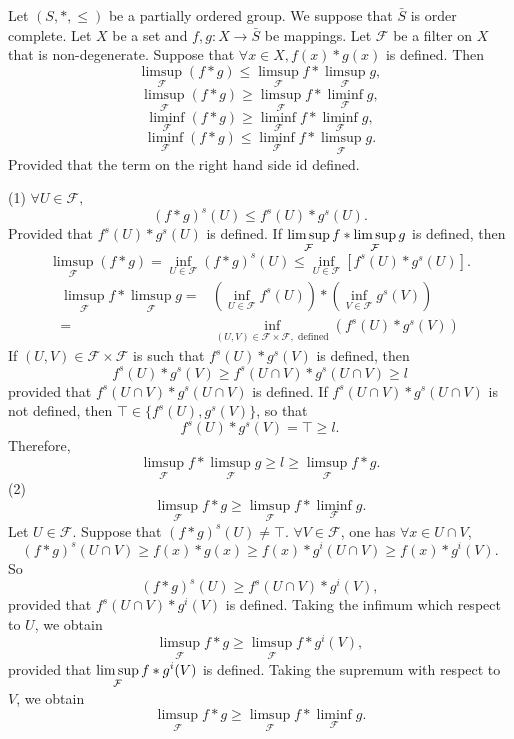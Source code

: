 \begin{theoremenv}
    Let $(S,*,\le)$ be a partially ordered group. We suppose that $\bar{S}$ is order complete. Let $X$ be a set and 
    $f,g:X\longrightarrow \bar{S}$ be mappings. Let $\mathcal{F}$ be a filter on $X$ that is non-degenerate. Suppose that $\forall x\in X, f(x)*g(x)$ is defined. Then 
    $$\limsup_{\mathcal{F}}(f*g)\le \limsup_{\mathcal{F}}f*\limsup_{\mathcal{F}}g,$$
    $$\limsup_{\mathcal{F}}(f*g)\ge \limsup_{\mathcal{F}}f*\liminf_{\mathcal{F}}g,$$
    $$\liminf_{\mathcal{F}}(f*g)\ge \liminf_{\mathcal{F}}f*\liminf_{\mathcal{F}}g,$$
    $$\liminf_{\mathcal{F}}(f*g)\le \liminf_{\mathcal{F}}f*\limsup_{\mathcal{F}}g.$$
    Provided that the term on the right hand side id defined.

\end{theoremenv}
\begin{proofenv}
    \quad\newline
    (1) $\forall U\in\mathcal{F},$
    $$(f*g)^s(U)\le f^s(U)*g^s(U).$$
    Provided that $f^s(U)* g^s(U)$ is defined.
    If $\displaystyle \limsup_{\mathcal{F}}f*\limsup_{\mathcal{F}}g$ is defined, then 
    $$\limsup _{\mathcal{F}}(f*g)=\inf_{U\in \mathcal{F}}(f*g)^s(U)\le \inf_{U\in \mathcal{F}}\left[f^s(U)*g^s(U)\right].$$
\begin{align*}
\limsup_{\mathcal{F}}f*\limsup_{\mathcal{F}}g=&\left(\inf_{U\in \mathcal{F}}f^s(U)\right)*\left(\inf_{V\in\mathcal{F}}g^s(V)\right)\\
=&\inf_{(U,V)\in \mathcal{F}\times\mathcal{F},\text{ defined}}\left(f^s(U)*g^s(V)\right)
\end{align*}
If $(U,V)\in \mathcal{F}\times\mathcal{F}$ is such that $f^s(U)*g^s(V)$ is defined, then 
$$f^s(U)* g^s(V)\ge f^s(U\cap V)*g^s(U\cap V)\ge l$$
provided that $f^s(U\cap V)*g^s(U\cap V)$ is defined.
If $f^s(U\cap V)*g^s(U\cap V)$ is not defined, then $\top\in\{f^s(U),g^s(V)\}$, so that 
$$f^s(U)*g^s(V)=\top \ge l.$$
Therefore, $$\limsup_{\mathcal{F}}f*\limsup_{\mathcal{F}}g\ge l\ge \limsup_{\mathcal{F}}f*g.$$
(2) $$\limsup_{\mathcal{F}}f*g\ge \limsup_\mathcal{F}f *\liminf_\mathcal{F}g.$$
Let $U\in\mathcal{F}$. Suppose that $\left(f*g\right)^s(U)\not=\top$. $\forall V\in \mathcal{F}$, one has $\forall x\in U\cap V$,
$$\left(f*g\right)^s(U\cap V)\ge f(x)*g(x)\ge f(x)*g^i(U\cap V)\ge f(x)*g^i(V).$$
So $$\left(f*g\right)^s(U)\ge f^s(U\cap V)*g^i(V),$$
provided that $f^s(U\cap V)*g^i(V)$ is defined. Taking the infimum which respect to $U$, we obtain
$$\limsup_{\mathcal{F}}f*g\ge \limsup_{\mathcal{F}}f*g^i(V),$$
provided that $\displaystyle \limsup_{\mathcal{F}}f*g^i(V)$ is defined. Taking the supremum with respect to $V$, we obtain
$$\limsup_{\mathcal{F}}f*g\ge \limsup_{\mathcal{F}}f*\liminf_{\mathcal{F}}g.$$
\end{proofenv}
